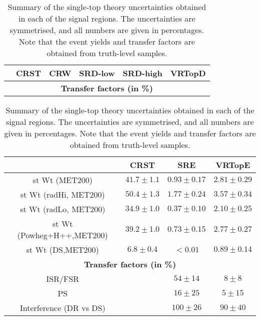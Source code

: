 \begin{description}
  \begin{table}[!h]
    \begin{center} \footnotesize
      \begin{tabular}{|c|c|c|c|c|c|}
        \hline
        & CRST & CRW & SRD-low & SRD-high & VRTopD \\ \hline
        \hline \hline
        
       \hline
       \multicolumn{6}{c}{\bf Transfer factors (in \%)} \\ \hline
       \hline

      \end{tabular}
    \end{center}
    \caption{Summary of the single-top theory uncertainties obtained in each of the signal regions. The uncertainties are symmetrised, and all numbers are given in percentages. Note that the event yields and transfer factors are obtained from truth-level samples. %
}
    \label{tab:single_top_unc4}
 \end{table}

  \begin{table}[!h]
    \begin{center} \footnotesize
      \begin{tabular}{|c|c|c|c|}
        \hline
        & CRST & SRE & VRTopE \\ \hline
        \hline \hline
        st Wt (MET200)&          $41.7\pm 1.1$&          $0.93\pm 0.17$&         $2.81\pm 0.29$\\
        st Wt (radHi, MET200)&   $50.4\pm 1.3$&          $1.77\pm 0.24$&         $3.57\pm 0.34$\\
        st Wt (radLo, MET200)&   $34.9\pm 1.0$&          $0.37\pm 0.10$&         $2.10\pm 0.25$\\
        st Wt (Powheg+H++,MET200)&       $39.2\pm 1.0$&          $0.73\pm 0.15$&         $2.77\pm 0.27$\\
        st Wt (DS,MET200)&       $6.8\pm 0.4$&   $<0.01$&        $0.89\pm 0.14$\\
       \hline
       \multicolumn{4}{c}{\bf Transfer factors (in \%)} \\ \hline
       \hline
       ISR/FSR &  &      $54\pm14$&      $8\pm8$\\
       PS &     &   $16\pm25$&      $5\pm15$\\
       Interference (DR vs DS) &    &    $100\pm26$&     $90\pm40$\\
       \hline
      \end{tabular}
    \end{center}
    \caption{Summary of the single-top theory uncertainties obtained in each of the signal regions. The uncertainties are symmetrised, and all numbers are given in percentages. Note that the event yields and transfer factors are obtained from truth-level samples. %
}
    \label{tab:single_top_unc5}
 \end{table}
  

\end{description}
